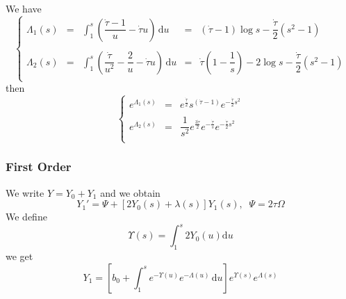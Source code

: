 \documentclass[11pt]{revtex4}
\begin{document}
We have
\begin{equation}
\left\lbrace
\begin{array}{rclcl}
\Lambda_1(s) & = &\int_{1}^s \left( \dfrac{\dot{\tau}-1}{u} - \dot{\tau} u \right) \, \mathrm{d}u & = & (\dot{\tau}-1) \log s - \dfrac{\dot{\tau}}{2}(s^2-1)\\
\\
\Lambda_2(s) & = &\int_{1}^s \left( \dfrac{\dot{\tau}}{u^2} - \dfrac{2}{u} - \dot{\tau} u \right) \, \mathrm{d}u & = & \dot{\tau}\left(1-\dfrac{1}{s}\right)-2 \log s - \dfrac{\dot{\tau}}{2}(s^2-1)\\
\end{array}
\right.
\end{equation}
then
\begin{equation}
\left\lbrace
\begin{array}{rcl}
e^{\Lambda_1(s)} & = & e^{\frac{\dot{\tau}}{2}}s^{\left(\dot{\tau}-1\right)} e^{-\frac{\dot{\tau}}{2}s^2 }\\
\\
e^{\Lambda_2(s)} & = & \dfrac{1}{s^2}e^{\frac{3\dot{\tau}}{2}} e^{-\frac{\dot{\tau}}{s}} e^{-\frac{\dot{\tau}}{2}s^2 }\\
\end{array}
\right.
\end{equation}

\subsubsection{First Order}

We write $Y=Y_0+Y_1$ and we obtain
\begin{equation}
	Y_1' = \Psi + \left[ 2 Y_0(s) + \lambda(s) \right] Y_1(s), \;\; \Psi = 2 \tau \Omega
\end{equation}
We define
\begin{equation}
	\Upsilon(s) = \int_1^s 2Y_0(u) \mathrm{d} u
\end{equation}
we get
\begin{equation}
	Y_1 = \left\lbrack b_0 + \int_1^s e^{-\Upsilon(u)} e^{-\Lambda(u)} \, \mathrm{d} u  \right\rbrack e^{\Upsilon(s)} e^{\Lambda(s)}
\end{equation}
\end{document}
